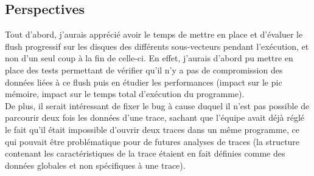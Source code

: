 
\subsection{Perspectives}\label{ssec:conclusion_perspectives}


Tout d'abord, j'aurais apprécié avoir le temps de mettre en place et d'évaluer le flush progressif sur les disques des différents sous-vecteurs pendant l'exécution, et non d'un seul coup à la fin de celle-ci.
En effet, j'aurais d'abord pu mettre en place des tests permettant de vérifier qu'il n'y a pas de compromission des données liées à ce flush puis en étudier les performances (impact sur le pic mémoire,
impact sur le temps total d'exécution du programme).\\
De plus, il serait intéressant de fixer le bug à cause duquel il n'est pas possible de parcourir deux fois les données d'une trace, sachant que l'équipe avait déjà réglé le fait qu'il était impossible 
d'ouvrir deux traces dans un même programme, ce qui pouvait être problématique pour de futures analyses de traces (la structure contenant les caractéristiques de la trace étaient en fait définies 
comme des données globales et non spécifiques à une trace).

